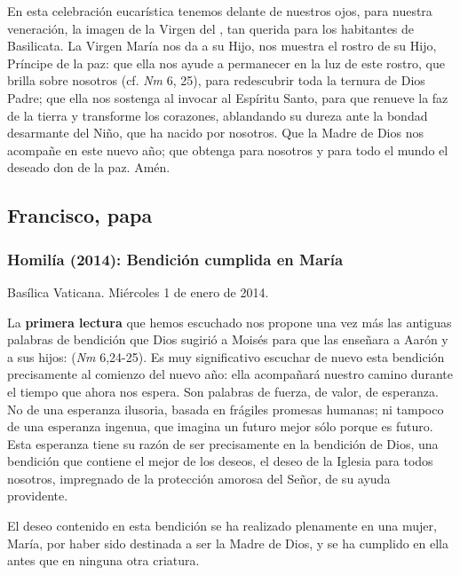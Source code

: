 \begin{body}
\begin{body}
{En esta celebración eucarística tenemos delante de nuestros ojos, para nuestra veneración, la imagen de la Virgen del , tan querida para los habitantes de Basilicata. La Virgen María nos da a su Hijo, nos muestra el rostro de su Hijo, Príncipe de la paz: que ella nos ayude a permanecer en la luz de este rostro, que brilla sobre nosotros (cf. \emph{Nm} 6, 25), para redescubrir toda la ternura de Dios Padre; que ella nos sostenga al invocar al Espíritu Santo, para que renueve la faz de la tierra y transforme los corazones, ablandando su dureza ante la bondad desarmante del Niño, que ha nacido por nosotros. Que la Madre de Dios nos acompañe en este nuevo año; que obtenga para nosotros y para todo el mundo el deseado don de la paz. Amén.


\subsection{Francisco, papa}





\subsubsection{Homilía (2014): Bendición cumplida en María}

Basílica Vaticana. Miércoles 1 de enero de 2014.

La \textbf{primera lectura} que hemos escuchado nos propone una vez más las antiguas palabras de bendición que Dios sugirió a Moisés para que las enseñara a Aarón y a sus hijos:  (\emph{Nm} 6,24-25). Es muy significativo escuchar de nuevo esta bendición precisamente al comienzo del nuevo año: ella acompañará nuestro camino durante el tiempo que ahora nos espera. Son palabras de fuerza, de valor, de esperanza. No de una esperanza ilusoria, basada en frágiles promesas humanas; ni tampoco de una esperanza ingenua, que imagina un futuro mejor sólo porque es futuro. Esta esperanza tiene su razón de ser precisamente en la bendición de Dios, una bendición que contiene el mejor de los deseos, el deseo de la Iglesia para todos nosotros, impregnado de la protección amorosa del Señor, de su ayuda providente.

El deseo contenido en esta bendición se ha realizado plenamente en una mujer, María, por haber sido destinada a ser la Madre de Dios, y se ha cumplido en ella antes que en ninguna otra criatura.

}
\end{body}
\end{body}
